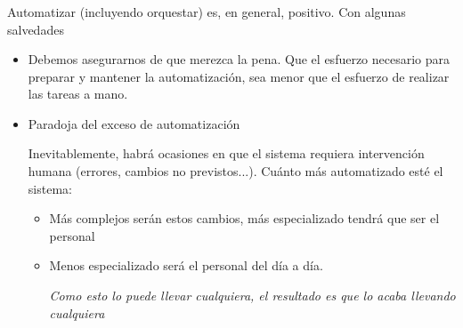 \documentclass[ucs]{beamer}
\begin{document}
\begin{frame}[fragile]
\frametitle{}
Automatizar (incluyendo orquestar) es, en general, positivo. Con algunas salvedades

\begin{itemize}
\item
Debemos asegurarnos de que merezca la pena. Que el esfuerzo
necesario para preparar y mantener la automatización, sea menor
que el esfuerzo de realizar las tareas a mano.

\item
Paradoja del exceso de automatización

Inevitablemente, habrá ocasiones en que el sistema requiera intervención
humana (errores, cambios no previstos...).
Cuánto más automatizado esté el sistema:

\begin{itemize}
\item
Más complejos serán estos cambios, más especializado
tendrá que ser el personal

\item
Menos especializado será el personal del día a día.

\emph{Como esto lo puede llevar cualquiera, el resultado es que lo acaba
llevando cualquiera}
\end{itemize}
\end{itemize}
\end{frame}
\end{document}
